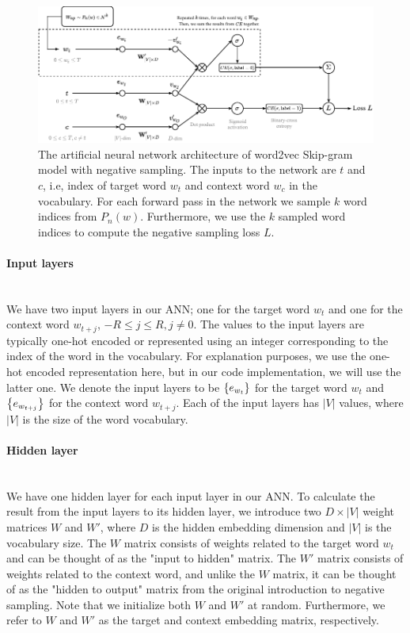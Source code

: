 \begin{figure}[ht]
    \centering
    \includegraphics[width=\textwidth]{thesis/figures/word2vec-sgns_cropped.pdf}
    \caption{The artificial neural network architecture of word2vec Skip-gram model with negative sampling. The inputs to the network are $t$ and $c$, i.e, index of target word $w_t$ and context word $w_c$ in the vocabulary. For each forward pass in the network we sample $k$ word indices from $P_n(w)$. Furthermore, we use the $k$ sampled word indices to compute the negative sampling loss $L$.}
    \label{fig:word2vec-skip-gram-negative-sampling}
\end{figure}

\paragraph*{Input layers}\mbox{} \\
We have two input layers in our ANN; one for the target word $w_t$ and one for the context word $w_{t+j}$, $-R \leq j \leq R, j \neq 0$. The values to the input layers are typically one-hot encoded or represented using an integer corresponding to the index of the word in the vocabulary. For explanation purposes, we use the one-hot encoded representation here, but in our code implementation, we will use the latter one. We denote the input layers to be $\left\{e_{w_t}\right\}$ for the target word $w_t$ and $\left\{e_{w_{t+j}}\right\}$ for the context word $w_{t+j}$. Each of the input layers has $|V|$ values, where $|V|$ is the size of the word vocabulary.

\paragraph*{Hidden layer}\mbox{} \\
We have one hidden layer for each input layer in our ANN. To calculate the result from the input layers to its hidden layer, we introduce two $D \times |V|$ weight matrices $W$ and $W'$, where $D$ is the hidden embedding dimension and $|V|$ is the vocabulary size. The $W$ matrix consists of weights related to the target word $w_t$ and can be thought of as the "input to hidden" matrix. The $W'$ matrix consists of weights related to the context word, and unlike the $W$ matrix, it can be thought of as the "hidden to output" matrix from the original introduction to negative sampling. Note that we initialize both $W$ and $W'$ at random. Furthermore, we refer to $W$ and $W'$ as the target and context embedding matrix, respectively.


